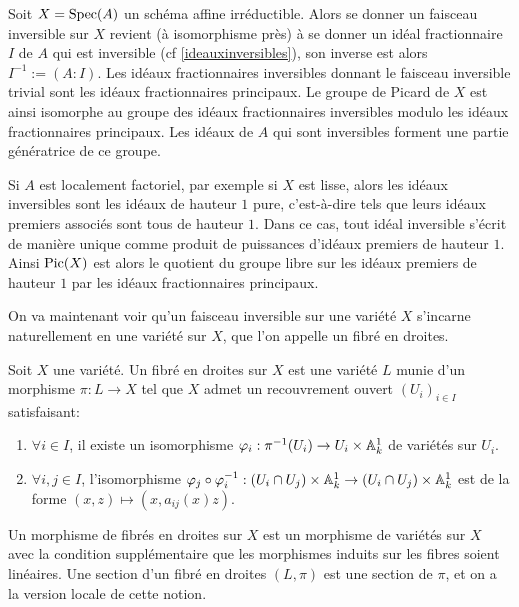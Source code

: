 \begin{ex}\label{expicaff}
Soit $X=\operatorname{Spec} (A)$ un schéma affine irréductible. Alors se donner un faisceau inversible sur $X$ revient (à isomorphisme près) à se donner un idéal fractionnaire $I$ de $A$ qui est inversible (cf \ref{ideauxinversibles}), son inverse est alors $I^{-1}:=(A:I)$. Les idéaux fractionnaires inversibles donnant le faisceau inversible trivial sont les idéaux fractionnaires principaux. Le groupe de Picard de $X$ est ainsi isomorphe au groupe des idéaux fractionnaires inversibles modulo les idéaux fractionnaires principaux. Les idéaux de $A$ qui sont inversibles forment une partie génératrice de ce groupe. 

Si $A$ est localement factoriel, par exemple si $X$ est lisse, alors les idéaux inversibles sont les idéaux de hauteur $1$ pure, c'est-à-dire tels que leurs idéaux premiers associés sont tous de hauteur $1$. Dans ce cas, tout idéal inversible s'écrit de manière unique comme produit de puissances d'idéaux premiers de hauteur $1$. Ainsi $\operatorname{Pic}(X)$ est alors le quotient du groupe libre sur les idéaux premiers de hauteur $1$ par les idéaux fractionnaires principaux.
\end{ex}

On va maintenant voir qu'un faisceau inversible sur une variété $X$ s'incarne naturellement en une variété sur $X$, que l'on appelle un fibré en droites.

\begin{defn}\label{linebundle}
Soit $X$ une variété. Un fibré en droites sur $X$ est une variété $L$ munie d'un morphisme $\pi:L\rightarrow X$ tel que $X$ admet un recouvrement ouvert $(U_i)_{i\in I}$ satisfaisant:

\begin{enumerate}
\item $\forall i\in I$, il existe un isomorphisme $\varphi_i :\pi^{-1}(U_i)\rightarrow U_i\times\mathbb{A}^1_k$ de variétés sur $U_i$.
\item $\forall i, j\in I$, l'isomorphisme $\varphi_j\circ \varphi_i^{-1}: (U_i\cap U_j)\times \mathbb{A}^1_k\rightarrow (U_i\cap U_j)\times \mathbb{A}^1_k$ est de la forme $(x, z)\mapsto (x, a_{ij}(x)z)$.
\end{enumerate}
Un morphisme de fibrés en droites sur $X$ est un morphisme de variétés sur $X$ avec la condition supplémentaire que les morphismes induits sur les fibres soient linéaires.
Une section d'un fibré en droites $(L, \pi)$ est une section de $\pi$, et on a la version locale de cette notion.
\end{defn}

